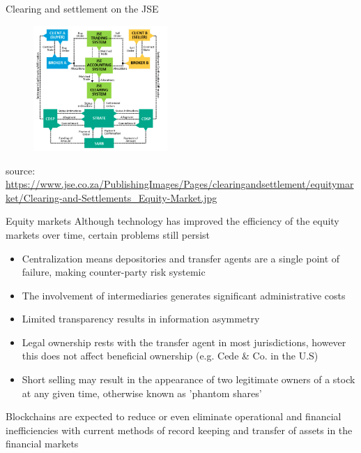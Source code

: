 \documentclass[9pt]{beamer}
\begin{document}
\begin{frame}{Clearing and settlement on the JSE}
	\begin{figure}[]
		\centering
		\includegraphics  [width=2in]{Images/settle}
	\end{figure}
	\begin{scriptsize}
		source: \href{https://www.jse.co.za/services/post-trade-services/clearing-and-settlement/cash-equities}{https://www.jse.co.za/PublishingImages/Pages/clearingandsettlement/equitymarket/Clearing-and-Settlements\_Equity-Market.jpg}
	\end{scriptsize}
\end{frame}




\begin{frame}{Equity markets}
	Although technology has improved the efficiency of the equity markets over time, certain problems still persist
	\begin{itemize}
		\item Centralization means depositories and transfer agents are a single point of failure, making counter-party risk systemic
		\item The involvement of intermediaries generates significant administrative costs
		\item Limited transparency results in information asymmetry
		\item Legal ownership rests with the transfer agent in most jurisdictions, however this does not affect beneficial ownership (e.g. Cede \& Co. in the U.S)
		\item Short selling may result in the appearance of two legitimate owners of a stock at any given time, otherwise known as 'phantom shares'
	\end{itemize}
	Blockchains are expected to reduce or even eliminate operational and financial inefficiencies with current methods of record keeping and transfer of assets in the financial markets
\end{frame}
\end{document}
